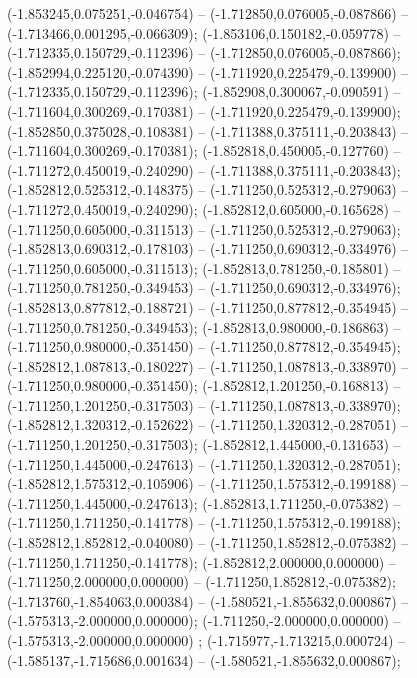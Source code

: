  (-1.853245,0.075251,-0.046754) -- (-1.712850,0.076005,-0.087866) -- (-1.713466,0.001295,-0.066309);
 (-1.853106,0.150182,-0.059778) -- (-1.712335,0.150729,-0.112396) -- (-1.712850,0.076005,-0.087866);
 (-1.852994,0.225120,-0.074390) -- (-1.711920,0.225479,-0.139900) -- (-1.712335,0.150729,-0.112396);
 (-1.852908,0.300067,-0.090591) -- (-1.711604,0.300269,-0.170381) -- (-1.711920,0.225479,-0.139900);
 (-1.852850,0.375028,-0.108381) -- (-1.711388,0.375111,-0.203843) -- (-1.711604,0.300269,-0.170381);
 (-1.852818,0.450005,-0.127760) -- (-1.711272,0.450019,-0.240290) -- (-1.711388,0.375111,-0.203843);
 (-1.852812,0.525312,-0.148375) -- (-1.711250,0.525312,-0.279063) -- (-1.711272,0.450019,-0.240290);
 (-1.852812,0.605000,-0.165628) -- (-1.711250,0.605000,-0.311513) -- (-1.711250,0.525312,-0.279063);
 (-1.852813,0.690312,-0.178103) -- (-1.711250,0.690312,-0.334976) -- (-1.711250,0.605000,-0.311513);
 (-1.852813,0.781250,-0.185801) -- (-1.711250,0.781250,-0.349453) -- (-1.711250,0.690312,-0.334976);
 (-1.852813,0.877812,-0.188721) -- (-1.711250,0.877812,-0.354945) -- (-1.711250,0.781250,-0.349453);
 (-1.852813,0.980000,-0.186863) -- (-1.711250,0.980000,-0.351450) -- (-1.711250,0.877812,-0.354945);
 (-1.852812,1.087813,-0.180227) -- (-1.711250,1.087813,-0.338970) -- (-1.711250,0.980000,-0.351450);
 (-1.852812,1.201250,-0.168813) -- (-1.711250,1.201250,-0.317503) -- (-1.711250,1.087813,-0.338970);
 (-1.852812,1.320312,-0.152622) -- (-1.711250,1.320312,-0.287051) -- (-1.711250,1.201250,-0.317503);
 (-1.852812,1.445000,-0.131653) -- (-1.711250,1.445000,-0.247613) -- (-1.711250,1.320312,-0.287051);
 (-1.852812,1.575312,-0.105906) -- (-1.711250,1.575312,-0.199188) -- (-1.711250,1.445000,-0.247613);
 (-1.852813,1.711250,-0.075382) -- (-1.711250,1.711250,-0.141778) -- (-1.711250,1.575312,-0.199188);
 (-1.852812,1.852812,-0.040080) -- (-1.711250,1.852812,-0.075382) -- (-1.711250,1.711250,-0.141778);
 (-1.852812,2.000000,0.000000) -- (-1.711250,2.000000,0.000000) -- (-1.711250,1.852812,-0.075382);
 (-1.713760,-1.854063,0.000384) -- (-1.580521,-1.855632,0.000867) -- (-1.575313,-2.000000,0.000000);
 (-1.711250,-2.000000,0.000000) -- (-1.575313,-2.000000,0.000000) ;
 (-1.715977,-1.713215,0.000724) -- (-1.585137,-1.715686,0.001634) -- (-1.580521,-1.855632,0.000867);
